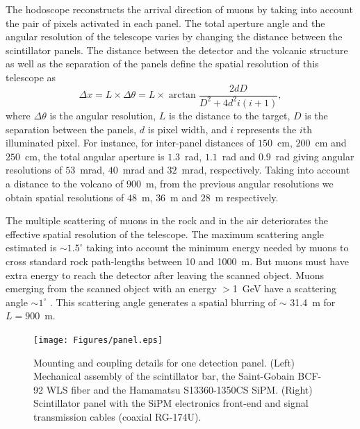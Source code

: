 \documentclass[letterpaper,11pt]{article}
\begin{document}
The hodoscope reconstructs the arrival direction of muons by taking into account the pair of pixels activated in each panel. The total aperture angle and the angular resolution of the telescope varies by changing the distance between the scintillator panels. The distance between the detector and the volcanic structure as well as the separation of the panels define the spatial resolution of this telescope as
\begin{equation}
\Delta x=L\times\Delta\theta=L\times \arctan{\frac{2dD}{D^2+4d^2i(i+1)}},
\end{equation}
where $\Delta\theta$ is the angular resolution, $L$ is the distance to the target, $D$ is the separation between the panels, $d$ is pixel width, and $i$ represents the $i$th illuminated pixel. For instance, for inter-panel distances of $150$~cm, $200$~cm and $250$~cm, the total angular aperture is $1.3$~rad, $1.1$~rad and $0.9$~rad giving angular resolutions of $53$~mrad, $40$~mrad and $32$~mrad, respectively. Taking into account a distance to the volcano of $900$~m, from the previous angular resolutions we obtain spatial resolutions of $48$~m, $36$~m and $28$~m respectively.

The multiple scattering of muons in the rock and in the air deteriorates the effective spatial resolution of the telescope. The maximum scattering angle estimated is $\sim 1.5^{\circ}$ taking into account the minimum energy needed by muons to cross standard rock path-lengths between 10 and 1000~m. But muons must have extra energy to reach the detector after leaving the scanned object. Muons emerging from the scanned object with an energy $>$1~GeV have a scattering angle $\sim 1^{\circ}$ \cite{Suarez2019}. This scattering angle generates a spatial blurring of $\sim$ 31.4~m for $L=900$~m.

\begin{figure}[htb]
\centering
\texttt{[image: Figures/panel.eps]}
\caption{Mounting and coupling details for one detection panel. (Left) Mechanical assembly of the scintillator bar, the Saint-Gobain BCF-92 WLS fiber and the Hamamatsu S13360-1350CS SiPM. (Right) Scintillator panel with the SiPM electronics front-end and signal transmission cables (coaxial RG-174U).}
\label{fig:frame}
\end{figure}
\end{document}
